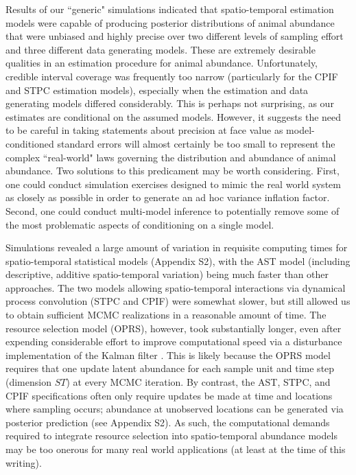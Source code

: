 \documentclass[times,mee,doublespace,]{besauth2}
\begin{document}
Results of our ``generic" simulations indicated that spatio-temporal estimation models were capable of producing posterior distributions of animal abundance that were unbiased and highly precise over two different levels of sampling effort and three different data generating models.  These are extremely desirable qualities in an estimation procedure for animal abundance. Unfortunately, credible interval coverage was frequently too narrow (particularly for the CPIF and STPC estimation models), especially when the estimation and data generating models differed considerably.  This is perhaps not surprising, as our estimates are conditional on the assumed models.  However, it suggests the need to be careful in taking statements about precision at face value as model-conditioned standard errors will almost certainly be too small to represent the complex ``real-world" laws governing the distribution and abundance of animal abundance.  Two solutions to this predicament may be worth considering.  First, one could conduct simulation exercises designed to mimic the real world system as closely as possible in order to generate an ad hoc variance inflation factor.  Second, one could conduct multi-model inference \citep[e.g. using Bayesian model averaging;][]{HoetingEtAl1999} to potentially remove some of the most problematic aspects of conditioning on a single model.

Simulations revealed a large amount of variation in requisite computing times for spatio-temporal statistical models (Appendix S2), with the AST model (including descriptive, additive spatio-temporal variation) being much faster than other approaches.  The two models allowing spatio-temporal interactions via dynamical process convolution (STPC and CPIF) were somewhat slower, but still allowed us to obtain sufficient MCMC realizations in a reasonable amount of time.  The resource selection model (OPRS), however, took substantially longer, even after expending considerable effort to improve computational speed via a disturbance implementation of the Kalman filter \citep[][; see Appendix S2]{DurbinKoopman2002}.  This is likely because the OPRS model requires that one update latent abundance for each sample unit and time step (dimension $ST$) at every MCMC iteration.  By contrast, the AST, STPC, and CPIF specifications often only require updates be made at time and locations where sampling occurs; abundance at unobserved locations can be generated via posterior prediction (see Appendix S2).  As such, the computational demands required to integrate resource selection into spatio-temporal abundance models may be too onerous for many real world applications (at least at the time of this writing).
\end{document}
